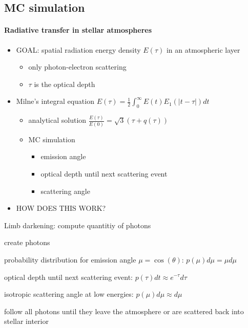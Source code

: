 \documentclass[../main/main.tex]{subfiles}
\begin{document}
\subsection{MC simulation}
\paragraph{Radiative transfer in stellar atmospheres}
\begin{itemize}
\item GOAL: spatial radiation energy density $E(\tau)$ in an atmospheric layer 
\begin{itemize}
\item only photon-electron scattering
\item $\tau$ is the optical depth
\end{itemize}

\item Milne's integral equation $\boxed{E(\tau) = \frac{1}{2} \int_0^{\infty} E(t) E_1(|t-\tau|) dt}$
\begin{itemize}
\item analytical solution $\frac{E(\tau)}{E(0)} = \sqrt{3} (\tau + q(\tau))$
\item MC simulation
\begin{itemize}
\item emission angle
\item optical depth until next scattering event
\item scattering angle
\end{itemize}
\end{itemize}

\item HOW DOES THIS WORK?
\end{itemize}

\begin{algorithm}
\caption{Limb darkening: compute quantitiy of photons}\label{limb_darkening}
\begin{algorithmic}
\State create photons

\State probability distribution for emission angle $\mu = \cos(\theta)$: $\boxed{p(\mu) d \mu = \mu d \mu}$

\State optical depth until next scattering event: $\boxed{p(\tau)dt \approx e^{-\tau} d\tau}$

\State isotropic scattering angle at low energies: $\boxed{p(\mu) d\mu \approx d\mu}$

\State follow all photons until they leave the atmosphere or are scattered back into stellar interior
\end{algorithmic}
\end{algorithm}
\end{document}
